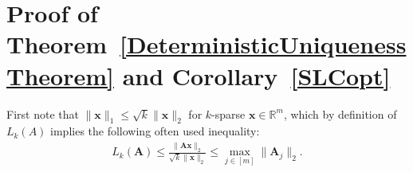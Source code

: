 \documentclass[9pt,twocolumn]{pnas-new}
\begin{document}
%


\section{Proof of Theorem~\ref{DeterministicUniquenessTheorem} and Corollary~\ref{SLCopt}}\label{DUT}

First note that $\|\mathbf{x}\|_1 \leq \sqrt{k} \|\mathbf{x}\|_2$ for $k$-sparse $\mathbf{x} \in \mathbb{R}^m$, which by definition of $L_k(A)$ implies the following often used inequality:
\begin{align}\label{delrho}
L_k(\mathbf{A}) \leq \frac{\|\mathbf{A}\mathbf{x}\|_2}{\sqrt{k} \|\mathbf{x}\|_2} %
\leq  \max_{j \in [m]}\|\mathbf{A}_j\|_2.
\end{align}
\end{document}
